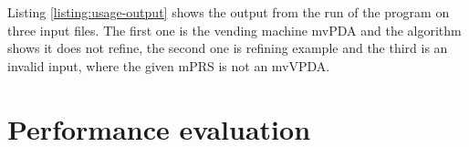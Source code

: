 \begin{example}
Listing \ref{listing:usage-output} shows the output from the run
of the program on three input files. The first one is the vending machine mvPDA
and the algorithm shows it does not refine, the second one is refining example
and the third is an invalid input, where the given mPRS is not an mvVPDA.
\end{example}



\section{Performance evaluation}








